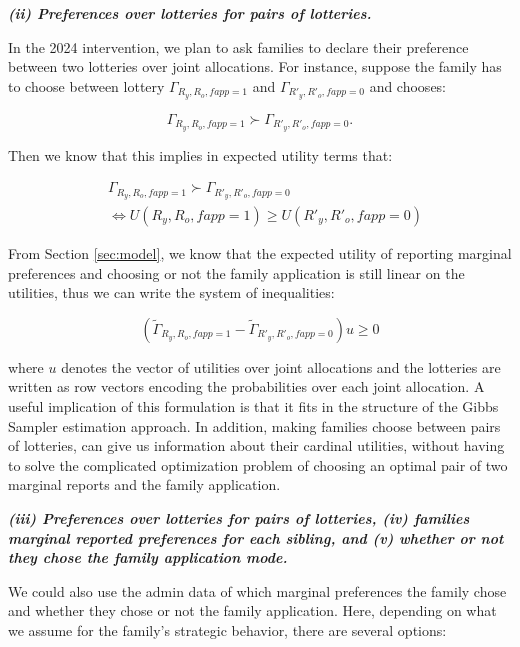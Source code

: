 \documentclass{article}
\begin{document}
\textbf{\textit{(ii) Preferences over lotteries for pairs of lotteries.}}

In the 2024 intervention, we plan to ask families to declare their preference between two lotteries over joint allocations. For instance, suppose the family has to choose between lottery $\Gamma_{R_y, R_o, fapp=1}$ and $\Gamma_{R'_y, R'_o, fapp=0}$ and chooses:

\begin{equation}
    \Gamma_{R_y, R_o, fapp=1} \succ \Gamma_{R'_y, R'_o, fapp=0}.
\end{equation}

Then we know that this implies in expected utility terms that:

\begin{align*}
    & \Gamma_{R_y, R_o, fapp=1} \succ \Gamma_{R'_y, R'_o, fapp=0} \\
    & \iff U(R_y, R_o, fapp=1) \geq U(R'_y, R'_o, fapp=0) 
\end{align*}

From Section \ref{sec:model}, we know that the expected utility of reporting marginal preferences and choosing or not the family application is still linear on the utilities, thus we can write the system of inequalities:

\begin{equation}
    \left( \tilde{\Gamma}_{R_y, R_o, fapp=1} -  \tilde{\Gamma}_{R'_y, R'_o, fapp=0} \right) u \geq 0
\end{equation}

where $u$ denotes the vector of utilities over joint allocations and the lotteries are written as row vectors encoding the probabilities over each joint allocation. A useful implication of this formulation is that it fits in the structure of the Gibbs Sampler estimation approach. In addition, making families choose between pairs of lotteries, can give us information about their cardinal utilities, without having to solve the complicated optimization problem of choosing an optimal pair of two marginal reports and the family application. 

\textbf{\textit{(iii) Preferences over lotteries for pairs of lotteries, (iv) families marginal reported preferences for each sibling, and (v) whether or not they chose the family application mode.}}

We could also use the admin data of which marginal preferences the family chose and whether they chose or not the family application. Here, depending on what we assume for the family's strategic behavior, there are several options: 
\end{document}
